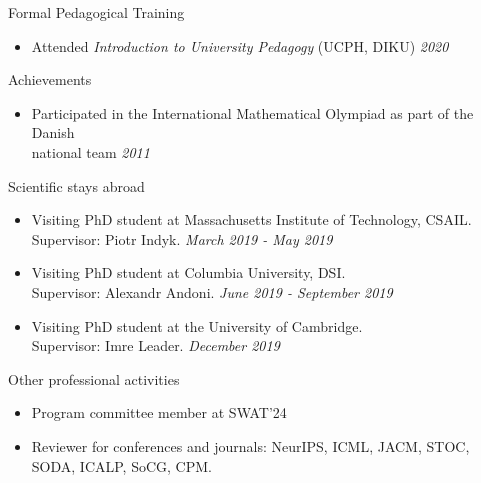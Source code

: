 \documentclass{resume} %
\begin{document}
 \begin{rSection}{Formal Pedagogical Training}
 \begin{itemize}
  \item  Attended \emph{Introduction to University Pedagogy} (UCPH, DIKU) \hfill{\emph{2020}}
 \end{itemize}
 \end{rSection}

\begin{rSection}{Achievements}
\begin{itemize}
\item Participated in the International Mathematical Olympiad as part of the Danish \\ national team  \hfill{\emph{2011}}
\end{itemize}
\end{rSection}


\begin{rSection}{Scientific stays abroad}
\begin{itemize}
\item Visiting PhD student at Massachusetts Institute of Technology, CSAIL. \\Supervisor: Piotr Indyk. \hfill{\emph{March 2019 - May 2019}}
\item Visiting PhD student at Columbia University, DSI. \\ Supervisor: Alexandr Andoni. \hfill{\emph{June 2019 - September 2019}}
\item Visiting PhD student at the University of Cambridge.  \\Supervisor: Imre Leader. \hfill{\emph{December 2019}}
\end{itemize}

\end{rSection}


\begin{rSection}{Other professional activities}
\begin{itemize}
\item Program committee member at SWAT'24
\item Reviewer for conferences and journals: NeurIPS, ICML, JACM, STOC, SODA, ICALP, SoCG, CPM.
\end{itemize}

\end{rSection}
\end{document}
